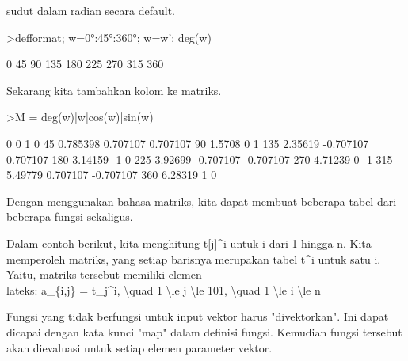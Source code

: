 \documentclass[a4paper,10pt]{article}
\begin{document}
\begin{eulernotebook}
\begin{eulercomment}
\begin{eulercomment}
\begin{eulercomment}
\begin{eulercomment}
\begin{eulercomment}
\begin{eulercomment}
\begin{eulercomment}
sudut dalam radian secara default.
\end{eulercomment}
\begin{eulerprompt}
>defformat; w=0°:45°:360°; w=w'; deg(w)
\end{eulerprompt}
\begin{euleroutput}
              0 
             45 
             90 
            135 
            180 
            225 
            270 
            315 
            360 
\end{euleroutput}
\begin{eulercomment}
Sekarang kita tambahkan kolom ke matriks.
\end{eulercomment}
\begin{eulerprompt}
>M = deg(w)|w|cos(w)|sin(w)
\end{eulerprompt}
\begin{euleroutput}
              0             0             1             0 
             45      0.785398      0.707107      0.707107 
             90        1.5708             0             1 
            135       2.35619     -0.707107      0.707107 
            180       3.14159            -1             0 
            225       3.92699     -0.707107     -0.707107 
            270       4.71239             0            -1 
            315       5.49779      0.707107     -0.707107 
            360       6.28319             1             0 
\end{euleroutput}
\begin{eulercomment}
Dengan menggunakan bahasa matriks, kita dapat membuat beberapa tabel
dari beberapa fungsi sekaligus.

Dalam contoh berikut, kita menghitung t[j]\textasciicircum{}i untuk i dari 1 hingga n.
Kita memperoleh matriks, yang setiap barisnya merupakan tabel t\textasciicircum{}i
untuk satu i. Yaitu, matriks tersebut memiliki elemen \\
lateks: a\_\{i,j\} = t\_j\textasciicircum{}i, \textbackslash{}quad 1 \textbackslash{}le j \textbackslash{}le 101, \textbackslash{}quad 1 \textbackslash{}le i \textbackslash{}le n

Fungsi yang tidak berfungsi untuk input vektor harus "divektorkan".
Ini dapat dicapai dengan kata kunci "map" dalam definisi fungsi.
Kemudian fungsi tersebut akan dievaluasi untuk setiap elemen parameter
vektor.


\end{eulercomment}
\end{eulercomment}
\end{eulercomment}
\end{eulercomment}
\end{eulercomment}
\end{eulercomment}
\end{eulercomment}
\end{eulernotebook}
\end{document}

